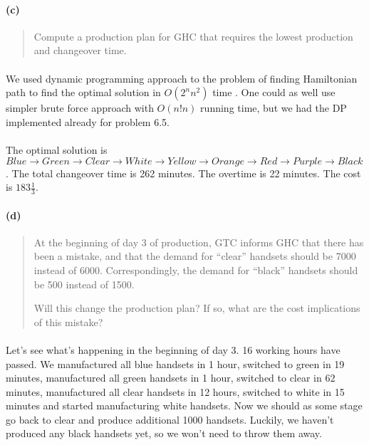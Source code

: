 \paragraph{(c)}
\begin{quote}
Compute a production plan for GHC that requires the lowest production and
changeover time.
\end{quote}

\paragraph{}
We used dynamic programming approach to the problem of finding Hamiltonian path to find the optimal solution in $O(2^n n^2)$ time \cite{karp62}. One could as well use simpler brute force approach with $O(n! n)$ running time, but we had the DP implemented already for problem 6.5.

\paragraph{}
The optimal solution is $ Blue \rightarrow Green \rightarrow Clear \rightarrow White \rightarrow Yellow \rightarrow Orange \rightarrow Red \rightarrow Purple \rightarrow Black $. The total changeover time is 262 minutes. The overtime is 22 minutes. The cost is \texteuro $183\frac{1}{3}$.

\paragraph{(d)}
\begin{quote}
At the beginning of day 3 of production, GTC informs GHC that there has been a mistake, and that the demand for ``clear'' handsets should be 7000 instead of 6000. Correspondingly, the demand for ``black'' handsets should be 500 instead of 1500.

Will this change the production plan? If so, what are the cost implications of this mistake?
\end{quote}

\paragraph{}
Let's see what's happening in the beginning of day 3. 16 working hours have passed. We manufactured all blue handsets in 1 hour, switched to green in 19 minutes, manufactured all green handsets in 1 hour, switched to clear in 62 minutes, manufactured all clear handsets in 12 hours, switched to white in 15 minutes and started manufacturing white handsets. Now we should as some stage go back to clear and produce additional 1000 handsets. Luckily, we haven't produced any black handsets yet, so we won't need to throw them away.

